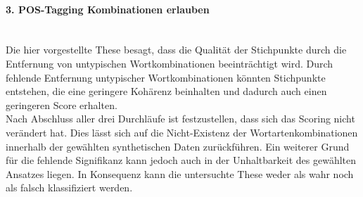 \paragraph{3. POS-Tagging Kombinationen erlauben}\mbox{}\\
Die hier vorgestellte These besagt, dass die Qualität der Stichpunkte durch die Entfernung von untypischen Wortkombinationen beeinträchtigt wird. Durch fehlende Entfernung untypischer Wortkombinationen könnten Stichpunkte entstehen, die eine geringere Kohärenz beinhalten und dadurch auch einen geringeren Score erhalten.\\

Nach Abschluss aller drei Durchläufe ist festzustellen, dass sich das Scoring nicht verändert hat. Dies lässt sich auf die Nicht-Existenz der Wortartenkombinationen innerhalb der gewählten synthetischen Daten zurückführen. Ein weiterer Grund für die fehlende Signifikanz kann jedoch auch in der Unhaltbarkeit des gewählten Ansatzes liegen. In Konsequenz kann die untersuchte These weder als wahr noch als falsch klassifiziert werden.
